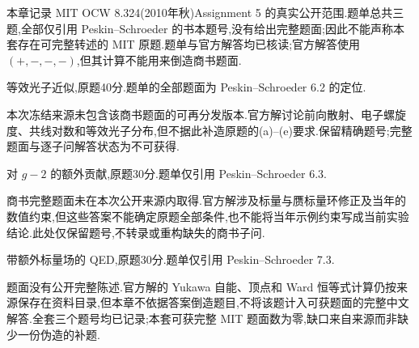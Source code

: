 本章记录 MIT OCW 8.324(2010年秋)Assignment 5 的真实公开范围.题单总共三题,全部仅引用 Peskin--Schroeder 的书本题号,没有给出完整题面;因此不能声称本套存在可完整转述的 MIT 原题.题单与官方解答均已核读;官方解答使用 $(+,-,-,-)$,但其计算不能用来倒造商书题面.

\begin{exercise}
等效光子近似,原题40分.题单的全部题面为 Peskin--Schroeder 6.2 的定位.
\end{exercise}
\begin{solution}
本次冻结来源未包含该商书题面的可再分发版本.官方解讨论前向散射、电子螺旋度、共线对数和等效光子分布,但不据此补造原题的(a)--(e)要求.保留精确题号;完整题面与逐子问解答状态为不可获得.
\end{solution}

\begin{exercise}
对 $g-2$ 的额外贡献,原题30分.题单仅引用 Peskin--Schroeder 6.3.
\end{exercise}
\begin{solution}
商书完整题面未在本次公开来源内取得.官方解涉及标量与赝标量环修正及当年的数值约束,但这些答案不能确定原题全部条件,也不能将当年示例约束写成当前实验结论.此处仅保留题号,不转录或重构缺失的商书子问.
\end{solution}

\begin{exercise}
带额外标量场的 QED,原题30分.题单仅引用 Peskin--Schroeder 7.3.
\end{exercise}
\begin{solution}
题面没有公开完整陈述.官方解的 Yukawa 自能、顶点和 Ward 恒等式计算仍按来源保存在资料目录,但本章不依据答案倒造题目,不将该题计入可获题面的完整中文解答.全套三个题号均已记录;本套可获完整 MIT 题面数为零,缺口来自来源而非缺少一份伪造的补题.
\end{solution}
